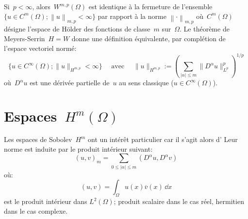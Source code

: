 \medskip{}
Si~$p<\infty$, alors~$W^{m,p}(\Omega)$ est identique à la fermeture de l'ensemble
$\lbrace u \in C^m(\Omega) ; \left\|u \right\|_{m,p} < \infty \rbrace$ par rapport à la norme
$\left\|\cdot\right\|_{m,p}$ où~$C^m(\Omega)$ désigne l'espace de H\"older des fonctions de
classe~$m$ sur~$\Omega$.
\medskipvm
Le théorème de Meyers-Serrin~$H=W$ donne une définition équivalente, par complétion de l'espace
vectoriel normé:
\begin{equation}
\{u\in C^\infty(\Omega);\| u \|_{H^{m, p}} < \infty\}\quad\text{ avec }\quad
\| u \|_{H^{m, p}}:= \left( \sum_{| \alpha | \leqslant m} \| D^{\alpha} u \|_{L^{p}}^p \right)^{1/p}
\end{equation}
où~$D^\alpha u$ est une dérivée partielle de~$u$ au sens classique ($u \in C^\infty(\Omega)$).


\medskip
\section{Espaces~$H^m(\Omega)$}

\begin{definition}
\end{definition}

\medskip
Les espaces de Sobolev~$H^m$ ont un intérêt particulier car il s'agit alors d'
Leur norme est induite par le produit intérieur suivant:
\begin{equation}(u,v)_{m} =\sum \limits _{0 \leqslant \vert \alpha\vert\leqslant m} \left( D^{\alpha} u, D^{\alpha} v\right)
\end{equation}
où: 
\begin{equation}(u,v) = \int_{\Omega} u(x) \overline{v}(x)\, \dd x
\end{equation}
est le produit intérieur dans $L^{2} ( \Omega)$; produit scalaire dans le cas réel, hermitien dans le cas complexe.

\medskip
{}

